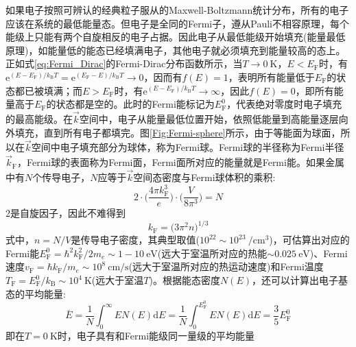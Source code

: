 \begin{itemize}
如果电子按照可辨认的经典粒子服从的Maxwell-Boltzmann统计分布，所有的电子应该在系统的最低能量态。但电子是全同的Fermi子，遵从Pauli不相容原理，每个能级上只能有两个自旋相反的电子占据。因此电子从最低能级开始填充(能量最低原理)，如能量低的能态已经填满电子，其他电子就必须填充到能量较高的态上。正如式\eqref{eq:Fermi_Dirac}的Fermi-Dirac分布函数所示，当$T\rightarrow0~\mathrm{K}$，$E<E_{\mathrm{F}}$时，有$\mathrm{e}^{(E-E_{\mathrm{F}})/k_{\mathrm{B}}T}=\mathrm{e}^{(E_{\mathrm{F}}-E)/k_{\mathrm{B}}T}\rightarrow0$，因而有$f(E)=1$，表明所有能量低于$E_{\mathrm{F}}$的状态都已被填满；而$E>E_{\mathrm{F}}$时，有$\mathrm{e}^{(E-E_{\mathrm{F}})/k_{\mathrm{B}}T}\rightarrow\infty$，因此$f(E)=0$，即所有能量高于$E_{\mathrm{F}}$的状态都是空的。此时的Fermi能标记为$E_{\mathrm{F}}^0$，代表绝对零度时电子填充的最高能级。在$\vec k$空间中，电子从能量最低位置开始，依照低能量到高能量逐层向外填充，直到所有电子都填完。图\ref{Fig:Fermi-sphere}所示，由于等能面为球面，所以在$\vec k$空间中电子填充部分为球体，称为Fermi球。Fermi球的半径称为Fermi半径$\vec k_{\mathrm{F}}$，Fermi球的表面称为Fermi面，Fermi面所对应的能量就是Fermi能。如果金属中有$N$个传导电子，$N$应等于$\vec k$空间态密度与Fermi球体积的乘积:
\begin{equation}
	2\cdot\bigg(\dfrac{4\pi k_{\mathrm F}^3}e\bigg)\cdot\bigg(\dfrac{V}{8\pi^3}\bigg)=N
	\label{eq:total_ele-Number}
\end{equation}
2是自旋因子，因此不难得到
\begin{equation}
	k_{\mathrm F}=\big(3\pi^2n\big)^{1/3}
	\label{eq:Fermi-radius}
\end{equation}
式中，$n=N/V$是传导电子密度，其典型取值($10^{22}\sim10^{23}~/\mathrm{cm}^3$)，可估算出对应的Fermi能$E_{\mathrm{F}}^0=\hbar^2k_{\mathrm F}^2/2m_e\sim1-10~\mathrm{eV}$(远大于室温所对应的热能$\sim0.025~\mathrm{eV}$)、Fermi速度$v_{\mathrm{F}}=\hbar k_{\mathrm{F}}/m_e\sim10^8~\mathrm{cm/s}$(远大于室温所对应的热运动速度)和Fermi温度$T_{\mathrm{F}}=E_{\mathrm{F}}^0/k_{\mathrm{B}}\sim10^4~\mathrm{K}$(远大于室温$T$)。根据能态密度$N(E)$，还可以计算出电子基态的平均能量:
\begin{equation}
	\bar{E}=\dfrac1N\int_0^{\infty}EN(E)\mathrm{d}E=\dfrac1N\int_0^{E_{\mathrm{F}}^0}EN(E)\mathrm{d}E=\dfrac35E_{\mathrm{F}}^0
	\label{eq:Electron_energy-ave}
\end{equation} 
即在$T=0~\mathrm{K}$时，电子具有和Fermi能级同一量级的平均能量


\end{itemize}
